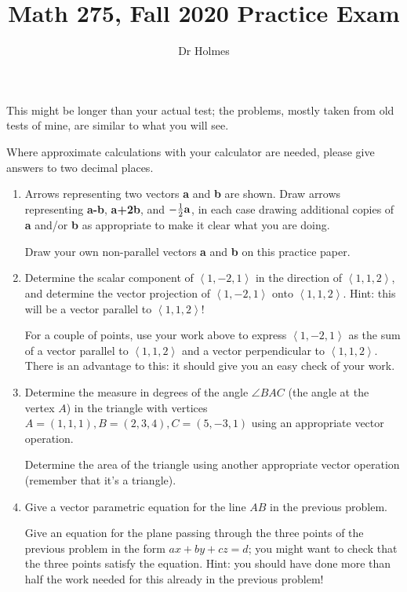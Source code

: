 \documentclass[12pt]{article}
\title{Math 275, Fall 2020 Practice Exam}
\author{Dr Holmes}
\begin{document}
\maketitle

This might be longer than your actual test;  the problems, mostly taken from old tests of mine, are similar to what you will see.

Where approximate calculations with your calculator are needed, please give answers to two decimal places.

\newpage

\begin{enumerate}

\item  Arrows representing two vectors {\bf a} and {\bf b} are shown.  Draw arrows representing {\bf a-b}, {\bf a+2b}, and $-\frac12 {\bf a}$, in each case drawing additional copies of {\bf a} and/or {\bf b} as appropriate to make it clear what you are doing.

Draw your own non-parallel vectors {\bf a} and {\bf b} on this practice paper.

\newpage

\item  Determine the scalar component of $\left<1,-2,1\right>$ in the direction of $\left<1,1,2\right>$, and determine the vector projection of 
$\left<1,-2,1\right>$ onto $\left<1,1,2\right>$.  Hint:  this will be a vector parallel to $\left<1,1,2\right>$!

For a couple of points, use your work above to express $\left<1,-2,1\right>$ as the sum of a vector parallel to $\left<1,1,2\right>$ and a vector
perpendicular to $\left<1,1,2\right>$.  There is an advantage to this:  it should give you an easy check of your work.

\newpage

\item  Determine the measure in degrees of the angle $\angle BAC$ (the angle at the vertex $A$) in the triangle with vertices $A=(1,1,1), B=(2,3,4),  C=(5,-3,1)$ using an appropriate vector operation.

Determine the area of the triangle using another appropriate vector operation (remember that it's a triangle).

\newpage

\item  Give a vector parametric equation for the line $AB$ in the previous problem.

Give an equation for the plane passing through the three points of the previous problem in the form $ax+by+cz=d$;  you might want to check that the three points satisfy the equation.
Hint:  you should have done more than half the  work needed for this already in the previous problem!


\end{enumerate}
\end{document}
